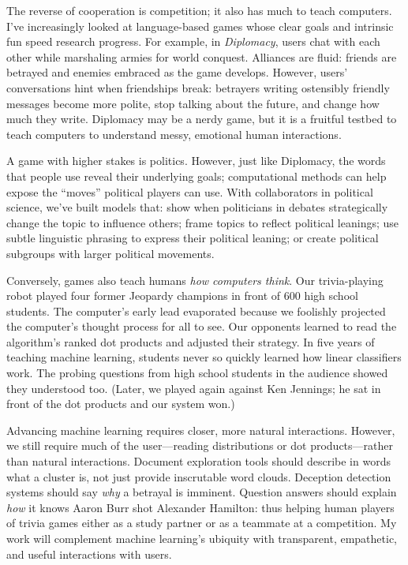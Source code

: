 \documentclass[11pt, amssymb, a4paper, one column]{article}
\begin{document}
The reverse of cooperation is competition; it also has much to teach
computers. I've increasingly looked at language-based games whose clear goals
and intrinsic fun speed research progress.  For example, in \emph{Diplomacy},
users chat with each other while marshaling armies for world conquest.
Alliances are fluid: friends are betrayed and enemies embraced as the game
develops. However, users' conversations hint when friendships break:
betrayers writing ostensibly friendly messages become more
polite, stop talking about the future, and change how much they
write.  Diplomacy may be a nerdy game, but it is a fruitful
testbed to teach computers to understand messy, emotional human interactions.

A game with higher stakes is politics.  However, just like Diplomacy,
the words that people use reveal their underlying goals; computational
methods can help expose the ``moves'' political players can use.  With
collaborators in political science, we've built models that: show when
politicians in debates strategically change the topic to influence
others; frame topics to reflect political leanings; use subtle
linguistic phrasing to express their political leaning; or create
political subgroups with larger political movements.

Conversely, games also teach humans \emph{how computers think}.  Our
trivia-playing robot played four former Jeopardy champions
in front of 600 high school students. The computer's early
lead evaporated because we foolishly projected the computer's thought process for
all to see.  Our opponents learned to read the algorithm's ranked dot
products and adjusted their strategy. In five years
of teaching machine learning, students never so
quickly learned how linear classifiers work.  The probing questions from
high school students in the audience showed they understood too.
(Later, we played again against Ken Jennings; he sat in front of
the dot products and our system won.)

Advancing machine learning requires closer, more natural interactions.
However, we still require much of the user---reading distributions or
dot products---rather than natural interactions.  Document
exploration tools should describe in words what a cluster is, not just
provide inscrutable word clouds.  Deception detection systems should
say \emph{why} a betrayal is imminent.  Question answers should
explain \emph{how} it knows Aaron Burr shot Alexander Hamilton: thus
helping human players of trivia games either as a study partner or as
a teammate at a competition. My work will complement machine
learning's ubiquity with transparent, empathetic, and useful
interactions with users.
\end{document}
